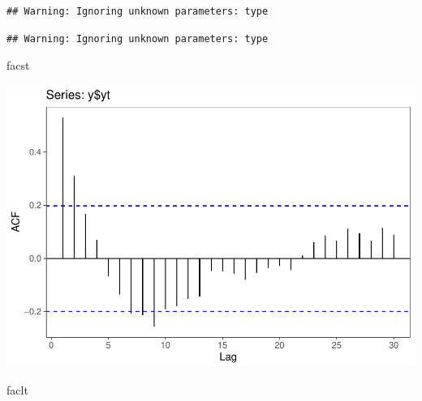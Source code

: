 \documentclass[
]{article}
\newenvironment{Shaded}{\begin{snugshade}}{\end{snugshade}}
\newcommand{\DataTypeTok}[1]{\textcolor[rgb]{0.13,0.29,0.53}{#1}}
\newcommand{\DecValTok}[1]{\textcolor[rgb]{0.00,0.00,0.81}{#1}}
\newcommand{\KeywordTok}[1]{\textcolor[rgb]{0.13,0.29,0.53}{\textbf{#1}}}
\newcommand{\NormalTok}[1]{#1}
\newcommand{\OperatorTok}[1]{\textcolor[rgb]{0.81,0.36,0.00}{\textbf{#1}}}
\newcommand{\StringTok}[1]{\textcolor[rgb]{0.31,0.60,0.02}{#1}}
\begin{document}
\begin{verbatim}
## Warning: Ignoring unknown parameters: type
\end{verbatim}

\begin{Shaded}
\end{Shaded}

\begin{verbatim}
## Warning: Ignoring unknown parameters: type
\end{verbatim}

\begin{Shaded}
\begin{Highlighting}[]
\NormalTok{facst}
\end{Highlighting}
\end{Shaded}

\begin{center}\includegraphics{Econo2_P5_files/figure-latex/plots fac facp-1} \end{center}

\begin{Shaded}
\begin{Highlighting}[]
\NormalTok{faclt}
\end{Highlighting}
\end{Shaded}
\end{document}
